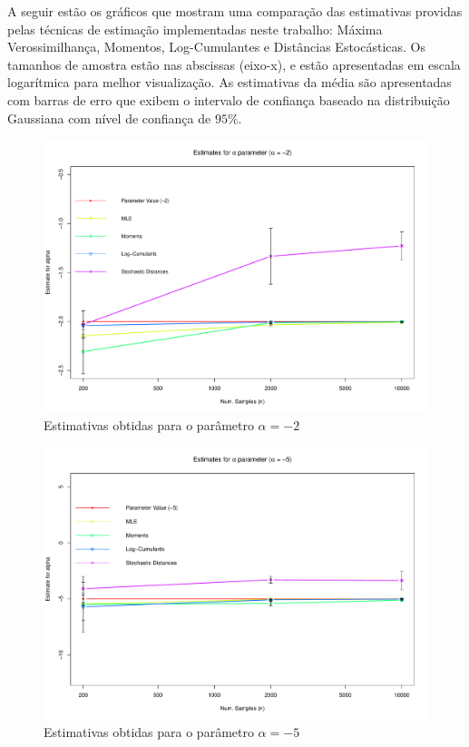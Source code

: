 \documentclass[12pt]{article}
\begin{document}
A seguir estão os gráficos que mostram uma comparação das estimativas providas pelas técnicas de estimação implementadas neste trabalho: Máxima Verossimilhança, Momentos, Log-Cumulantes e Distâncias Estocásticas. Os tamanhos de amostra estão nas abscissas (eixo-x), e estão apresentadas em escala logarítmica para melhor visualização. As estimativas da média são apresentadas com barras de erro que exibem o intervalo de confiança baseado na distribuição Gaussiana com nível de confiança de $95\%$.
\begin{figure}[H]
     \centering
     \includegraphics[scale=0.5]{plots/ComparisonAlpha-2.pdf}
     \caption{Estimativas obtidas para o parâmetro $\alpha = -2$}
     \label{graf_5}
\end{figure}
\begin{figure}[H]
     \centering
     \includegraphics[scale=0.5]{plots/ComparisonAlpha-5.pdf}
     \caption{Estimativas obtidas para o parâmetro $\alpha = -5$}
     \label{graf_6}
\end{figure}
\end{document}
